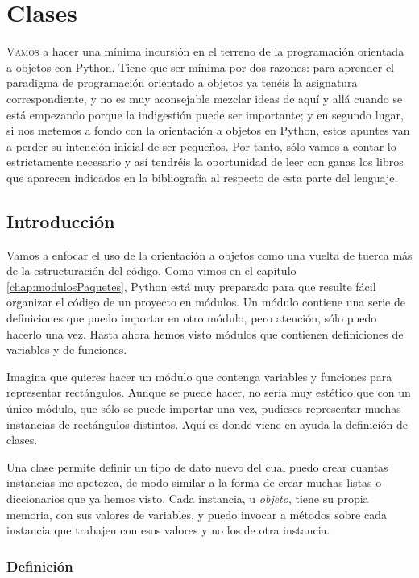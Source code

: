 
\chapter{Clases}

\lettrine[lines=5]{V}{amos} a hacer una mínima incursión en el terreno de la programación orientada a objetos con Python. Tiene que ser mínima por dos razones: para aprender el paradigma de programación orientado a objetos ya tenéis la asignatura correspondiente, y no es muy aconsejable mezclar ideas de aquí y allá cuando se está empezando porque la indigestión puede ser importante; y en segundo lugar, si nos metemos a fondo con la orientación a objetos en Python, estos apuntes van a perder su intención inicial de ser pequeños. Por tanto, sólo vamos a contar lo estrictamente necesario y así tendréis la oportunidad de leer con ganas los libros que aparecen indicados en la bibliografía al respecto de esta parte del lenguaje.

\section{Introducción}

Vamos a enfocar el uso de la orientación a objetos como una vuelta de tuerca más de la estructuración del código. Como vimos en el capítulo \ref{chap:modulosPaquetes}, Python está muy preparado para que resulte fácil organizar el código de un proyecto en módulos. Un módulo contiene una serie de definiciones que puedo importar en otro módulo, pero atención, sólo puedo hacerlo una vez. Hasta ahora hemos visto módulos que contienen definiciones de variables y de funciones.

Imagina que quieres hacer un módulo que contenga variables y funciones para representar rectángulos. Aunque se puede hacer, no sería muy estético que con un único módulo, que sólo se puede importar una vez, pudieses representar muchas instancias de rectángulos distintos. Aquí es donde viene en ayuda la definición de clases.

Una clase permite definir un tipo de dato nuevo del cual puedo crear cuantas instancias me apetezca, de modo similar a la forma de crear muchas listas o diccionarios que ya hemos visto. Cada instancia, u \emph{objeto}, tiene su propia memoria, con sus valores de variables, y puedo invocar a métodos sobre cada instancia que trabajen con esos valores y no los de otra instancia.

\subsection{Definición}

